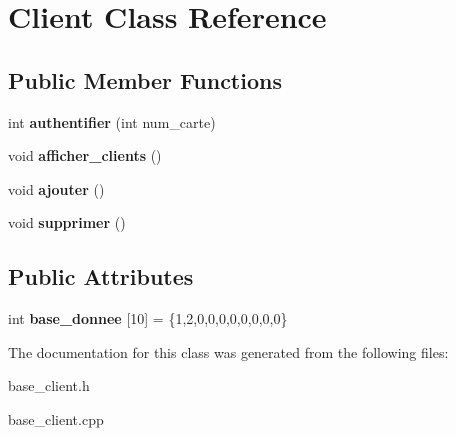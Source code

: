 \hypertarget{classClient}{}\section{Client Class Reference}
\label{classClient}
\subsection*{Public Member Functions}
\begin{DoxyCompactItemize}
\item 
\mbox{\label{classClient_a06622f5a776719ad115ac5367000717d}} 
int {\bfseries authentifier} (int num\+\_\+carte)
\item 
\mbox{\label{classClient_a87d330f26fecac776dd10263cddf95e6}} 
void {\bfseries afficher\+\_\+clients} ()
\item 
\mbox{\label{classClient_a4cd2c9536200e1539d353319bd33ca25}} 
void {\bfseries ajouter} ()
\item 
\mbox{\label{classClient_a705b832bc83ae5f63022cbecdd506537}} 
void {\bfseries supprimer} ()
\end{DoxyCompactItemize}
\subsection*{Public Attributes}
\begin{DoxyCompactItemize}
\item 
\mbox{\label{classClient_a4d86b268ae777812e10bf97b3ed90d4e}} 
int {\bfseries base\+\_\+donnee} \mbox{[}10\mbox{]} = \{1,2,0,0,0,0,0,0,0,0\}
\end{DoxyCompactItemize}


The documentation for this class was generated from the following files\+:\begin{DoxyCompactItemize}
\item 
base\+\_\+client.\+h\item 
base\+\_\+client.\+cpp\end{DoxyCompactItemize}
